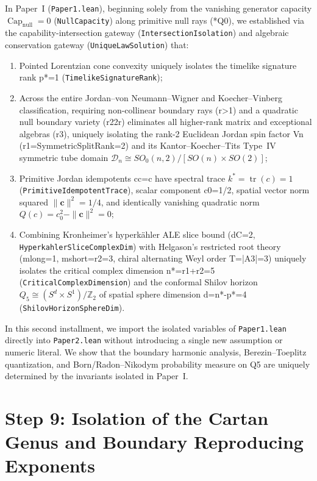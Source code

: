 \documentclass[11pt,reqno]{amsart}
\theoremstyle{definition}
\theoremstyle{remark}
\newcommand{\CapNull}{\operatorname{Cap}_{\mathrm{null}}}
\newcommand{\tr}{\operatorname{tr}}
\begin{document}
In Paper~I (\texttt{Paper1.lean}), beginning solely from the vanishing generator capacity $\CapNull = 0$ (\texttt{NullCapacity}) along primitive null rays (*Q0), we established via the capability-intersection gateway (\texttt{IntersectionIsolation}) and algebraic conservation gateway (\texttt{UniqueLawSolution}) that:
\begin{enumerate}[label=(\roman*)]
  \item Pointed Lorentzian cone convexity uniquely isolates the timelike signature rank p*=1 (\texttt{TimelikeSignatureRank});
  \item Across the entire Jordan--von Neumann--Wigner and Koecher--Vinberg classification, requiring non-collinear boundary rays (r>1) and a quadratic null boundary variety (r22r) eliminates all higher-rank matrix and exceptional algebras (r3), uniquely isolating the rank-2 Euclidean Jordan spin factor Vn (r1=SymmetricSplitRank=2) and its Kantor--Koecher--Tits Type~IV symmetric tube domain $\mathcal{D}_n \cong SO_0(n,2)/[SO(n)\times SO(2)]$;
  \item Primitive Jordan idempotents cc=c have spectral trace $k^* = \tr(c) = 1$ (\texttt{PrimitiveIdempotentTrace}), scalar component c0=1/2, spatial vector norm squared $\|\mathbf{c}\|^2 = 1/4$, and identically vanishing quadratic norm $Q(c) = c_0^2 - \|\mathbf{c}\|^2 = 0$;
  \item Combining Kronheimer's hyperk\"ahler ALE slice bound (dC=2, \texttt{HyperkahlerSliceComplexDim}) with Helgason's restricted root theory (mlong=1, mshort=r2=3, chiral alternating Weyl order T=|A3|=3) uniquely isolates the critical complex dimension n*=r1+r2=5 (\texttt{CriticalComplexDimension}) and the conformal Shilov horizon $Q_5 \cong (S^d \times S^1)/\mathbb{Z}_2$ of spatial sphere dimension d=n*-p*=4 (\texttt{ShilovHorizonSphereDim}).
\end{enumerate}

In this second installment, we import the isolated variables of \texttt{Paper1.lean} directly into \texttt{Paper2.lean} without introducing a single new assumption or numeric literal. We show that the boundary harmonic analysis, Berezin--Toeplitz quantization, and Born/Radon--Nikodym probability measure on Q5 are uniquely determined by the invariants isolated in Paper~I.

\section{Step 9: Isolation of the Cartan Genus and Boundary Reproducing Exponents}
\end{document}
